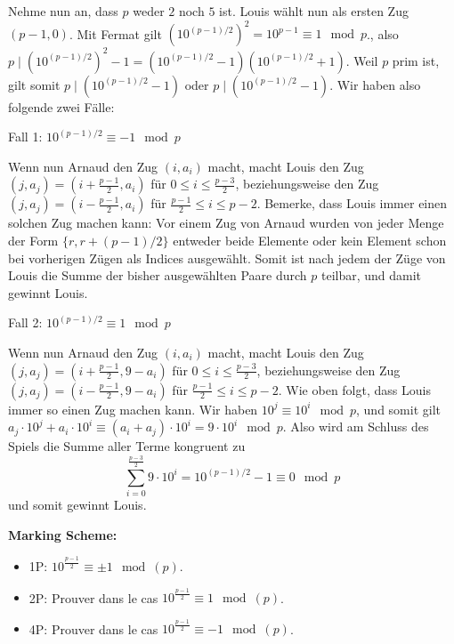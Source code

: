 \documentclass[language=german,style=solution]{smo}
\begin{document}
\begin{enumerate}[label=\textbf{\arabic*.}]
Nehme nun an, dass $p$ weder $2$ noch $5$ ist. Louis wählt nun als ersten Zug $(p-1,0)$. Mit Fermat gilt $(10^{(p-1)/2})^2=10^{p-1}\equiv 1 \mod{p}$., also $p\mid (10^{(p-1)/2})^2-1=(10^{(p-1)/2}-1)(10^{(p-1)/2}+1)$. Weil $p$ prim ist, gilt somit $p\mid (10^{(p-1)/2}-1)$ oder $p\mid (10^{(p-1)/2}-1)$. Wir haben also folgende zwei Fälle:

Fall 1: $10^{(p-1)/2}\equiv -1\mod p$

Wenn nun Arnaud den Zug $(i, a_i)$ macht, macht Louis den Zug $(j,a_j)=(i+\frac{p-1}{2},a_i)$ für $0\leq i\leq \frac{p-3}{2}$, beziehungsweise den Zug $(j,a_j)=(i-\frac{p-1}{2},a_i)$ für $\frac{p-1}{2}\leq i\leq p-2$. Bemerke, dass Louis immer einen solchen Zug machen kann: Vor einem Zug von Arnaud wurden von jeder Menge der Form $\{r, r+(p-1)/2\}$ entweder beide Elemente oder kein Element schon bei vorherigen Zügen als Indices ausgewählt. Somit ist nach jedem der Züge von Louis die Summe der bisher ausgewählten Paare durch $p$ teilbar, und damit gewinnt Louis.

Fall 2: $10^{(p-1)/2}\equiv 1\mod p$

Wenn nun Arnaud den Zug $(i, a_i)$ macht, macht Louis den Zug $(j,a_j)=(i+\frac{p-1}{2},9-a_i)$ für $0\leq i\leq \frac{p-3}{2}$, beziehungsweise den Zug $(j,a_j)=(i-\frac{p-1}{2},9-a_i)$ für $\frac{p-1}{2}\leq i\leq p-2$. Wie oben folgt, dass Louis immer so einen Zug machen kann. Wir haben $10^j\equiv 10^i\mod p$, und somit gilt $a_j\cdot 10^j+a_i\cdot 10^i\equiv (a_i+a_j)\cdot 10^i=9\cdot 10^i\mod p$. Also wird am Schluss des Spiels die Summe aller Terme kongruent zu 
\[ \sum_{i=0}^{\frac{p-3}{2}}9\cdot 10^i=10^{(p-1)/2}-1\equiv 0\mod p \]
und somit gewinnt Louis.

\textbf{Marking Scheme:}
\begin{itemize}
	\item 1P: $10^{\frac{p-1}{2}} \equiv \pm 1 \mod(p)$.
	\item 2P: Prouver dans le cas $10^{\frac{p-1}{2}} \equiv 1 \mod(p)$.
	\item 4P: Prouver dans le cas $10^{\frac{p-1}{2}} \equiv -1 \mod(p)$.
\end{itemize}

\end{enumerate}


\bigskip

\vspace{1cm}
\end{document}
